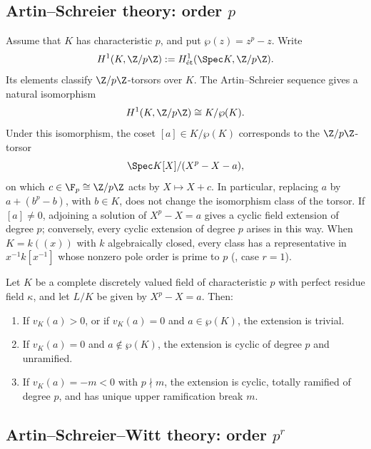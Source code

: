 \subsection{Artin--Schreier theory: order \texorpdfstring{$p$}{p}}

Assume that $K$ has characteristic $p$, and put $\wp(z)=z^p-z$. Write
\[
H^1(K,\Z/p\Z):=H^1_{\mathrm{\acute et}}(\Spec K,\Z/p\Z).
\]
Its elements classify $\Z/p\Z$-torsors over $K$. The Artin--Schreier
sequence gives a natural isomorphism
\[
H^1(K,\Z/p\Z)\cong K/\wp(K).
\]
Under this isomorphism, the coset $[a]\in K/\wp(K)$ corresponds to the
$\Z/p\Z$-torsor
\[
\Spec K[X]/(X^p-X-a),
\]
on which $c\in\F_p\cong\Z/p\Z$ acts by $X\mapsto X+c$. In particular,
replacing $a$ by $a+(b^p-b)$, with $b\in K$, does not change the
isomorphism class of the torsor. If $[a]\neq0$, adjoining a solution of
$X^p-X=a$ gives a cyclic field extension of degree $p$; conversely, every
cyclic extension of degree $p$ arises in this way. When $K=k((x))$ with
$k$ algebraically closed, every class has a representative in
$x^{-1}k[x^{-1}]$ whose nonzero pole order is prime to $p$
(, case $r=1$).

\begin{theorem}
\label{theorem:artin_schreier_ramification}
Let $K$ be a complete discretely valued field of characteristic $p$ with
perfect residue field $\kappa$, and let $L/K$ be given by $X^p-X=a$. Then:
\begin{enumerate}
    \item If $v_K(a)>0$, or if $v_K(a)=0$ and $a\in\wp(K)$, the extension
    is trivial.
    \item If $v_K(a)=0$ and $a\notin\wp(K)$, the extension is cyclic of
    degree $p$ and unramified.
    \item If $v_K(a)=-m<0$ with $p\nmid m$, the extension is cyclic,
    totally ramified of degree $p$, and has unique upper ramification break
    $m$.
\end{enumerate}
\end{theorem}

\subsection{Artin--Schreier--Witt theory: order
\texorpdfstring{$p^r$}{p-power}}
\label{subsection:witt_vector_prerequisites}

